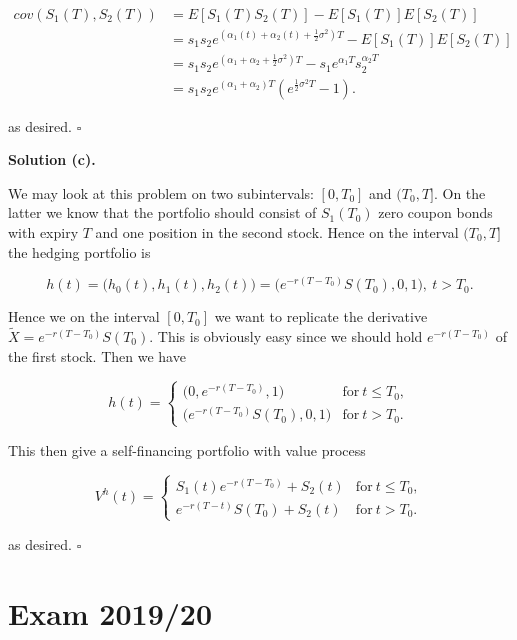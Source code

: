 \documentclass[
]{book}
\begin{document}
\begin{align*}
cov(S_1(T),S_2(T))&=E\left[S_1(T)S_2(T)\right]-E[S_1(T)]E[S_2(T)]\\
&=s_1s_2e^{(\alpha_1(t)+\alpha_2(t)+\frac{1}{2}\sigma^2)T}-E[S_1(T)]E[S_2(T)]\\
&=s_1s_2e^{(\alpha_1+\alpha_2+\frac{1}{2}\sigma^2)T}-s_1e^{\alpha_1T}s_2^{\alpha_2T}\\
&=s_1s_2e^{(\alpha_1+\alpha_2)T}\left(e^{\frac{1}{2}\sigma^2T}-1\right).
\end{align*}

as desired. \(\square\)

\noindent\makebox[\linewidth]{\rule{\textwidth}{0.4pt}}

\textbf{Solution (c).}

We may look at this problem on two subintervals: \([0,T_0]\) and \((T_0,T]\). On the latter we know that the portfolio should consist of \(S_1(T_0)\) zero coupon bonds with expiry \(T\) and one position in the second stock. Hence on the interval \((T_0,T]\) the hedging portfolio is

\[
h(t)=\Big(h_0(t),h_1(t),h_2(t)\Big)=\Big(e^{-r(T-T_0)}S(T_0),0,1\Big),\ t> T_0.
\]

Hence we on the interval \([0,T_0]\) we want to replicate the derivative \(\widetilde{X}=e^{-r(T-T_0)}S(T_0)\). This is obviously easy since we should hold \(e^{-r(T-T_0)}\) of the first stock. Then we have

\[
h(t)=\begin{cases}
\Big(0,e^{-r(T-T_0)},1\Big) &\text{for}\ t\le T_0,\\
\Big(e^{-r(T-T_0)}S(T_0),0,1\Big) &\text{for}\ t>T_0.
\end{cases}
\]

This then give a self-financing portfolio with value process

\[
V^h(t)=\begin{cases}
S_1(t)e^{-r(T-T_0)}+S_2(t) &\text{for}\ t\le T_0,\\
e^{-r(T-t)}S(T_0)+S_2(t) &\text{for}\ t>T_0.
\end{cases}
\]

as desired. \(\square\)

\noindent\makebox[\linewidth]{\rule{\textwidth}{0.4pt}}
\pagebreak

\hypertarget{exam-201920}{%
\section{Exam 2019/20}\label{exam-201920}}
\end{document}
